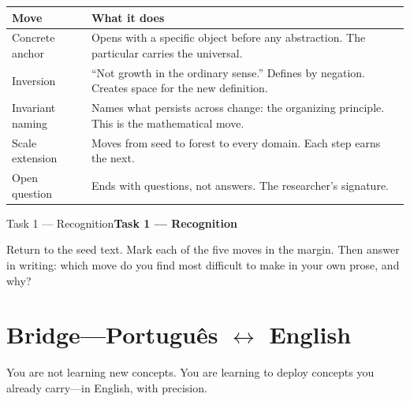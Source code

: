 \documentclass[11pt, twoside, openright]{book}
\theoremstyle{plain}
\theoremstyle{definition}
\newenvironment{notebox}[1][]{%
  \begin{mdframed}[backgroundcolor=SeedBox!50,linecolor=PrincipiaSlate,linewidth=0.5pt,innertopmargin=6pt,innerbottommargin=6pt]
  \ifx\relax#1\relax\else\noindent\textbf{#1}\par\medskip\fi}{\end{mdframed}}
\begin{document}
\bigskip
\begin{tabularx}{\textwidth}{@{}P{2.2cm}L@{}}
\toprule
\textbf{Move} & \textbf{What it does} \\
\midrule
Concrete anchor &
  Opens with a specific object before any abstraction.
  The particular carries the universal. \\[6pt]
Inversion &
  ``Not growth in the ordinary sense.'' Defines by negation.
  Creates space for the new definition. \\[6pt]
Invariant naming &
  Names what persists across change: the organizing principle.
  This is the mathematical move. \\[6pt]
Scale extension &
  Moves from seed to forest to every domain.
  Each step earns the next. \\[6pt]
Open question &
  Ends with questions, not answers. The researcher's signature. \\
\bottomrule
\end{tabularx}

\bigskip
\begin{notebox}[Task 1 --- Recognition]
Return to the seed text. Mark each of the five moves in the margin.
Then answer in writing: which move do you find most difficult to make
in your own prose, and why?
\end{notebox}

\section{Bridge---Portugu\^{e}s $\leftrightarrow$ English}
You are not learning new concepts. You are learning to deploy concepts
you already carry---in English, with precision.
\end{document}
